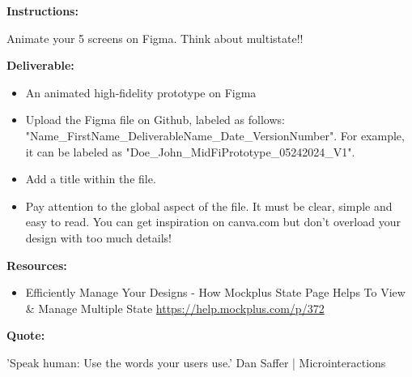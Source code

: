 \makeheaderfiles

\textbf{Instructions:}

Animate your 5 screens on Figma. Think about multistate!!

\textbf{Deliverable:}

\begin{itemize}
\item An animated high-fidelity prototype on Figma
\item Upload the Figma file on Github, labeled as follows: "Name\_FirstName\_DeliverableName\_Date\_VersionNumber". For example, it can be labeled as "Doe\_John\_MidFiPrototype\_05242024\_V1".
\item Add a title within the file.
\item Pay attention to the global aspect of the file. It must be clear, simple and easy to read. You can get inspiration on canva.com but don't overload your design with too much details!
\end{itemize}

\textbf{Resources:}

\begin{itemize}
\item Efficiently Manage Your Designs - How Mockplus State Page Helps To View \& Manage Multiple State \url{https://help.mockplus.com/p/372}
\end{itemize}

\textbf{Quote:}

'Speak human: Use the words your users use.' Dan Saffer | Microinteractions

